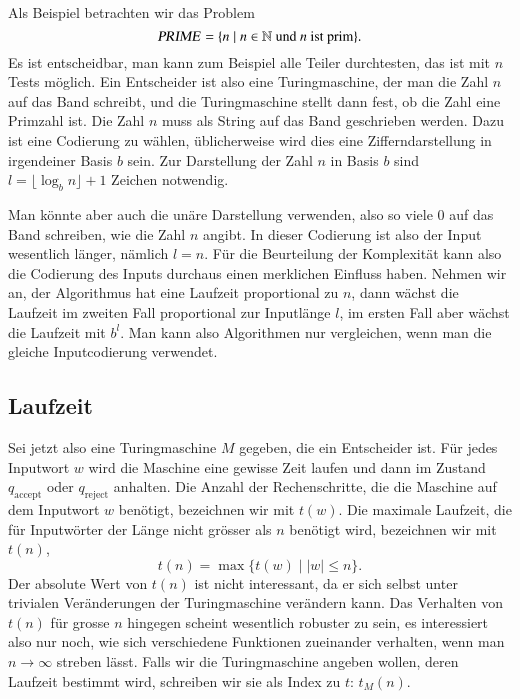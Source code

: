 Als Beispiel betrachten wir das Problem
\[
\text{\textsl{PRIME}}=\{ n\;|\; \text{$n\in\mathbb N$ und $n$ ist prim}\}.
\]
Es ist entscheidbar, man kann zum Beispiel alle Teiler durchtesten,
das ist mit $n$ Tests möglich. Ein Entscheider ist also eine Turingmaschine,
der man die Zahl $n$ auf das Band schreibt, und die Turingmaschine
stellt dann fest, ob die Zahl eine Primzahl ist. Die Zahl $n$ muss
als String auf das Band geschrieben werden. Dazu ist eine Codierung
zu wählen, üblicherweise wird dies eine Zifferndarstellung in
irgendeiner Basis $b$ sein. Zur Darstellung der Zahl $n$ in Basis $b$
sind $l=\lfloor \log_bn\rfloor+1$ Zeichen notwendig.

Man könnte aber auch die unäre Darstellung verwenden, also so viele
$0$ auf das Band schreiben, wie die Zahl $n$ angibt. In dieser Codierung
ist also der Input wesentlich länger, nämlich $l=n$.
Für die Beurteilung der
Komplexität kann also die Codierung des Inputs durchaus einen
merklichen Einfluss haben. Nehmen wir an, der Algorithmus hat
eine Laufzeit proportional zu $n$, dann wächst die Laufzeit im
zweiten Fall proportional zur Inputlänge $l$, im ersten Fall
aber wächst die Laufzeit mit $b^l$. Man kann also Algorithmen
nur vergleichen, wenn man die gleiche Inputcodierung verwendet.

\subsection{Laufzeit}
Sei jetzt also eine Turingmaschine $M$ gegeben, die ein Entscheider
ist. Für jedes Inputwort $w$ wird die Maschine eine gewisse Zeit
laufen und dann im Zustand $q_{\text{accept}}$ oder $q_{\text{reject}}$
anhalten. Die Anzahl der Rechenschritte, die die Maschine auf dem
Inputwort $w$ benötigt, bezeichnen wir mit $t(w)$.
Die maximale Laufzeit, die für Inputwörter der Länge nicht
grösser als $n$ benötigt wird, bezeichnen wir mit $t(n)$,
\[
t(n)=\max \{ t(w)\;|\; |w|\le n\}.
\]
Der absolute Wert von $t(n)$ ist nicht interessant, da er sich
selbst unter trivialen Veränderungen der Turingmaschine verändern
kann. Das Verhalten von $t(n)$ für grosse $n$ hingegen scheint
wesentlich robuster zu sein, es interessiert also nur noch, wie
sich verschiedene Funktionen zueinander verhalten, wenn man $n\to\infty$
streben lässt. Falls wir die Turingmaschine angeben wollen, deren
Laufzeit bestimmt wird, schreiben wir sie als Index zu $t$: $t_M(n)$.

